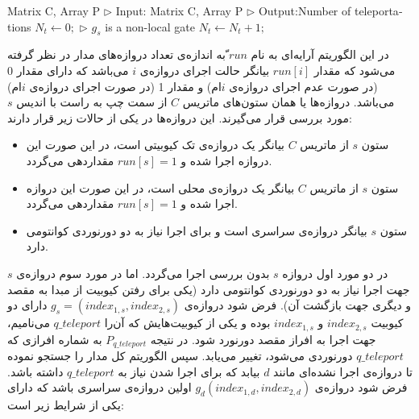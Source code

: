 \begin{algorithm}
{
\caption{$\text{:الگوریتم اصلی جهت بهینه‌سازی تعداد دوربری‌های کوانتومی در سطح دوم برای چند سیستم }$}
\fontsize{9}{1}
\begin{algorithmic}[1]
\begin{latin}
 {Matrix C, Array P}
\State\textcolor[rgb]{0.00,0.50,1.00}{ $\triangleright$ Input: Matrix C, Array P}
\State\textcolor[rgb]{0.00,0.50,1.00}{ $\triangleright$ Output:Number of teleportations}
\State $N_t\leftarrow 0;$
\Else
{} \State\textcolor[rgb]{0.00,0.50,1.00}{ $\triangleright$ $g_{s}$ is a non-local gate}
\State $N_t\leftarrow N_t+1;$
\EndIf
\EndIf
\EndFor
\EndFunction
\end{latin}
\end{algorithmic}
}
\end{algorithm}


در این الگوریتم آرایه‌ای به نام $run$ ّبه اندازه‌ی تعداد دروازه‌های مدار در نظر گرفته می‌شود که مقدار $run[i]$ بیانگر حالت اجرای دروازه‌ی $i$ می‌باشد که دارای مقدار 0 (در صورت عدم اجرای دروازه‌ی $i$ام) و مقدار 1 (در صورت اجرای دروازه‌ی $i$ام) می‌باشد. دروازه‌ها یا همان ستون‌های ماتریس  $C$ از سمت چپ به راست با اندیس $s$ مورد بررسی قرار می‌گیرند. این دروازه‌ها در یکی از حالات زیر قرار دارند:
\begin{itemize}
\item
ستون $s$ از ماتریس $C$ بیانگر یک دروازه‌ی تک کیوبیتی است، در این صورت این دروازه اجرا شده و $run[s]=1 $ مقداردهی می‌گردد.
\item
ستون $s$ از ماتریس $C$ بیانگر یک دروازه‌ی محلی است، در این صورت این دروازه اجرا شده و $run[s]=1 $ مقداردهی می‌گردد.
\item
ستون $s$ بیانگر دروازه‌ی سراسری است و برای اجرا نیاز به دو دورنوردی کوانتومی دارد.
\end{itemize}
 در دو مورد اول دروازه $s$ بدون بررسی اجرا می‌گردد. اما در مورد سوم دروازه‌ی $s$ جهت اجرا نیاز به دو دورنوردی کوانتومی دارد (یکی برای رفتن کیوبیت از مبدا به مقصد و دیگری جهت بازگشت آن). فرض شود دروازه‌ی $g_s=(index_{1,s},index_{2,s})$ دارای دو کیوبیت $index_{2,s}$ و $index_{1,s}$ بوده و یکی از کیوبیت‌هایش که آن‌را $q\_teleport$ می‌نامیم، جهت اجرا به افراز مقصد دورنورد شود. در نتیجه $P_{q\_teleport}$ به شماره افرازی که $q\_teleport$ دورنوردی می‌شود، تغییر می‌یابد. سپس الگوریتم کل مدار را جستجو نموده تا دروازه‌ی اجرا نشده‌ای مانند $d$ بیابد که برای اجرا شدن نیاز به $q\_teleport$ داشته باشد. فرض شود دروازه‌ی $g_{d} (index_{1,d},index_{2,d})$ اولین دروازه‌ی سراسری باشد که دارای یکی از شرایط زیر است:

